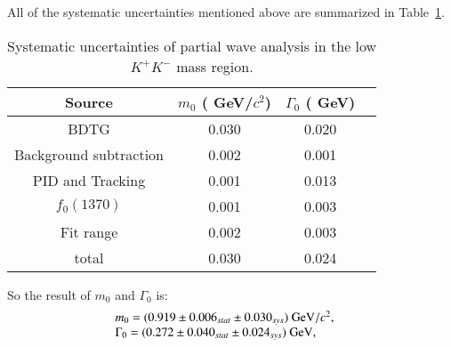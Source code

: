 {    All of the systematic uncertainties mentioned above are summarized in Table~\ref{MIPWA-Sys}.
    \begin{table}[htbp]
        \caption{Systematic uncertainties of partial wave analysis in the low $K^{+}K^{-}$ mass region.}
        \label{MIPWA-Sys}
        \begin{center}
            \begin{tabular}{cccc}
                \toprule\toprule
                Source   &                                                      $m_{0}$ ( GeV/$c^{2}$)  &$\Gamma_{0}$ ( GeV)\\
                \hline
                BDTG                     & 0.030                  &   0.020 \\
                Background subtraction   & 0.002                  &   0.001 \\
                PID and Tracking         & 0.001                  &   0.013 \\
                $f_{0}(1370)$            & 0.001                  &   0.003 \\
                Fit range                & 0.002                  &   0.003 \\

                \hline
                total                                   & 0.030                  &   0.024\\
                \bottomrule\bottomrule
            \end{tabular}
        \end{center}
    \end{table}
    So the result of $m_{0}$ and $\Gamma_{0}$ is:
    \begin{equation}
        \begin{array}{lr}
            m_{0} = (0.919 \pm 0.006_{stat} \pm 0.030_{sys}) \ {\rm GeV}/c^{2}, &\\
            \Gamma_{0} = (0.272 \pm 0.040_{stat} \pm 0.024_{sys})\ {\rm GeV}, &
        \end{array}\label{S-wave-sys} 
    \end{equation}

}
